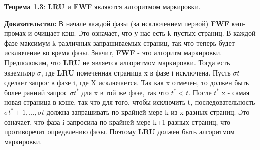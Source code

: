\vspace{\baselineskip}

\textbf{Теорема 1.3}: \textbf{LRU} и \textbf{FWF} являются алгоритмом маркировки.

\vspace{\baselineskip}

\textbf{Доказательство:} В начале каждой фазы (за исключением первой) \textbf{FWF} кэш-промах и очищает кэш. Это означает, что у нас есть k пустых страниц. В каждой фазе максимум k различных запрашиваемых страниц, так что теперь будет исключение во время фазы. Значит, \textbf{FWF} - это алгоритм маркировки. \\
Предположим, что \textbf{LRU} не является алгоритмом маркировки. Тогда есть экземпляр $\sigma$, где \textbf{LRU} помеченная страница x в фазе i исключена. Пусть $\sigma t$ сделает запрос в фазе i, где Х исключается. Так как x отмечен, то должен быть более ранний запрос $\sigma t^*$ для x в той же фазе, так что $t^* < t$. После $t^*$ x - самая новая страница в кэше, так что для того, чтобы исключить t, последовательность $\sigma t^* + 1, \dots, \sigma t$ должна запрашивать по крайней мере k из x разных страниц. Это означает, что фаза i запросила по крайней мере k+1 разных страниц, что противоречит определению фазы. Поэтому \textbf{LRU} должен быть алгоритмом маркировки.